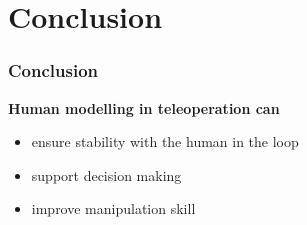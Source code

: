 \documentclass[student]{ITRslides}
\begin{document}
%
\section{Conclusion}


\begin{frame}
	\frametitle{Conclusion}

\vspace{6pt}
{\color{tum_blue}\textbf{Human modelling in teleoperation can}}\vspace{-6pt}
\noindent{\color{tum_blue}\rule[0.5ex]{\linewidth}{1.5pt}}
	\begin{itemize}
	\item ensure stability with the human in the loop
	\item support decision making 
	\item improve manipulation skill
	\end{itemize}
\end{frame}
\appendix
\end{document}

